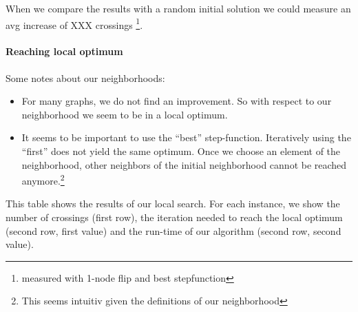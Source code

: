 \documentclass{scrartcl}
\begin{document}
When we compare the results with a random initial solution we could
measure an avg increase of XXX crossings 
\footnote{measured with 1-node flip and best stepfunction}.

\paragraph{Reaching local optimum}







Some notes about our neighborhoods:

\begin{itemize}
  \item For many graphs, we do not find an improvement. So with respect to our neighborhood we
  seem to be in a local optimum. 
  \item It seems to be important to use the ``best''
    step-function. Iteratively using the ``first'' does not yield the
    same optimum. Once we choose an element of the neighborhood, other
    neighbors of the initial neighborhood cannot be reached
    anymore.\footnote{This seems intuitiv given the definitions of our
      neighborhood}
\end{itemize}






\begin{landscape}
\begin{table}
  \scriptsize
  
\caption{This table shows the results of our local search. For each instance, we show the number of crossings (first row), the iteration 
needed to reach the local optimum (second row, first value) and the run-time of our algorithm (second row, second value).}
\label{tab:results}
\end{table}
\end{landscape}
\end{document}
